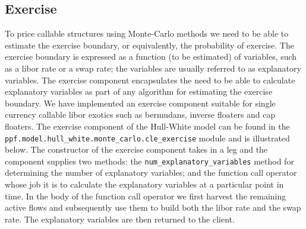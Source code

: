 \subsection{Exercise}
To price callable structures using Monte-Carlo methods we need to be
able to estimate the exercise boundary, or equivalently, the
probability of exercise. The exercise boundary is expressed as a
function (to be estimated) of variables, such as a libor rate or a
swap rate; the variables are usually referred to as explanatory
variables. The exercise component encapsulates the need to be able to
calculate explanatory variables as part of any algorithm for
estimating the exercise boundary. We have implemented an exercise
component suitable for single currency callable libor exotics such as
bermudans, inverse floaters and cap floaters. The exercise component
of the Hull-White model can be found in the
\verb|ppf.model.hull_white.monte_carlo.cle_exercise| module and is
illustrated below. The constructor of the exercise component takes in
a leg and the component supplies two methods: the
\verb|num_explanatory_variables| method for determining the number of
explanatory variables; and the function call operator whose job it is
to calculate the explanatory variables at a particular point in
time. In the body of the function call operator we first harvest the
remaining active flows and subsequently use them to build both the
libor rate and the swap rate. The explanatory variables are then
returned to the client.
